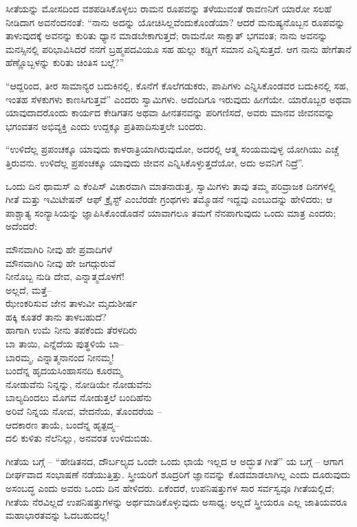 ಸೀತೆಯನ್ನು ಮೋಸದಿಂದ ವಶಪಡಿಸಿಕೊಳ್ಳಲು ರಾಮನ ರೂಪವನ್ನು ತಳೆಯುವಂತೆ ರಾವಣನಿಗೆ ಯಾರೋ ಸಲಹೆ ನೀಡಿದಾಗ ಅವನೆಂದನಂತೆ: “ನಾನು ಅದನ್ನು ಯೋಚಿಸಿಲ್ಲವೆಂದುಕೊಂಡೆಯಾ? ಆದರೆ ಮನುಷ್ಯನೊಬ್ಬನ ರೂಪವನ್ನು ತಾಳುವುದಕ್ಕೆ ಅವನನ್ನು ಕುರಿತು ಧ್ಯಾನ ಮಾಡಬೇಕಾಗುತ್ತದೆ; ರಾಮನೋ ಸಾಕ್ಷಾತ್ ಭಗವಂತ; ನಾನು ಅವನನ್ನು ಮನಸ್ಸಿನಲ್ಲಿ ಪರಿಭಾವಿಸಿದರೆ ನನಗೆ ಬ್ರಹ್ಮಪದವಿಯೂ ಸಹ ಹುಲ್ಲು ಕಡ್ಡಿಗೆ ಸಮಾನ ಎನ್ನಿಸುತ್ತದೆ. ಆಗ ನಾನು ಹೇಗೆತಾನೆ ಹೆಣ್ಣೊಬ್ಬಳನ್ನು ಕುರಿತು ಚಿಂತಿಸ ಬಲ್ಲೆ?”

“ಆದ್ದರಿಂದ, ತೀರ ಸಾಮಾನ್ಯರ ಬದುಕಿನಲ್ಲಿ, ಕೊನೆಗೆ ಕೊಲೆಗಡುಕರು, ಪಾಪಿಗಳು ಎನ್ನಿಸಿಕೊಂಡವರ ಬದುಕಿನಲ್ಲಿ ಸಹ, ಇಂತಹ ಸೆಳಕುಗಳು ಕಾಣಸಿಗುತ್ತವೆ” ಎಂದರು ಸ್ವಾಮಿಗಳು. ಅದೆಂದಿಗೂ ಇರುವುದು ಹೀಗೆಯೇ. ಯಾರೊಬ್ಬರ ಅಥವಾ ಯಾವುದಾದರೊಂದು ಕಾರ್ಯದ ಕೇಡಿಗತನ ಅಥವಾ ಹೀನತನವನ್ನು ಪರಿಗಣಿಸದೆ, ಅವರು ಮಾನವ ಜೀವನವನ್ನು ಭಗಂವತನ ಅಭಿವ್ಯಕ್ತಿ ಎಂದು ಉದ್ದಕ್ಕೂ ಪ್ರತಿಪಾದಿಸುತ್ತಲೇ ಬಂದರು.

“ಉಳಿದೆಲ್ಲ ಪ್ರಪಂಚಕ್ಕೂ ಯಾವುದು ಕಾಳರಾತ್ರಿಯಾಗಿರುವುದೋ, ಅದರಲ್ಲಿ ಆತ್ಮ ಸಂಯಮವುಳ್ಳ ಯೋಗಿಯು ಎಚ್ಚೆ ತ್ತಿರುವನು. ಉಳಿದೆಲ್ಲ ಪ್ರಪಂಚಕ್ಕೂ ಯಾವುದು ಜೀವನ ಎನ್ನಿಸಿಕೊಳ್ಳುತ್ತದೆಯೋ, ಅದು ಅವನಿಗೆ ನಿದ್ರೆ”.

ಒಂದು ದಿನ ಥಾಮಸ್ ಎ ಕೆಂಪಿಸ್ ವಿಚಾರವಾಗಿ ಮಾತನಾಡುತ್ತ, ಸ್ವಾಮಿಗಳು ತಾವು ತಮ್ಮ ಪರಿವ್ರಾಜಕ ದಿನಗಳಲ್ಲಿ ಗೀತೆ ಮತ್ತು ಇಮಿಟೇಷನ್ ಆಫ್ ಕ್ರೈಸ್ಟ್ ಎಂಬೆರಡೇ ಗ್ರಂಥಗಳು ತಮ್ಮೊಡನೆ ಇದ್ದವು ಎಂಬುದನ್ನು ಹೇಳಿದರು; ಆ ಪಾಶ್ಚಾತ್ಯ ಸಂನ್ಯಾಸಿಯನ್ನು ಜ್ಞಾಪಿಸಿಕೊಂಡೊಡನೆ ಯಾವಾಗಲೂ ತಮಗೆ ನೆನಪಾಗುವುದು ಒಂದು ಮಾತ್ರ ಎಂದರು; ಅದೆಂದರೆ:

\begin{myquote}
ಮೌನವಾಗಿರಿ ನೀವು ಹೇ ಪ್ರವಾದಿಗಳೆ\\ಮೌನವಾಗಿರಿ ನೀವು ಹೇ ಜಗದ್ಗುರುವೆ\\ನೀನೊಬ್ಬ ನುಡಿ ದೇವ, ಎನ್ನಾತ್ಮದೊಳಗೆ!\\ಅಲ್ಲದೆ, ಮತ್ತೆ–\\ಝೇಂಕರಿಸುವ ಜೇನ ತಾಳುವೀ ಮೃದುಶೀರ್ಷ\\ಹಕ್ಕಿ ಕೂತರೆ ತಾನು ತಾಳಬಹುದೆ?\\ಹಾಗಾಗಿ ಉಮೆ ನೀನು ತಪಕೆಂದು ತೆರಳದಿರು\\ಬಾ ತಾಯಿ, ಎನ್ನೆದೆಯ ಪುತ್ಥಳಿಯೆ ಬಾ–\\ಬಾರಮ್ಮ, ಎನ್ನಾತ್ಮನಾನಂದ ನೀನಮ್ಮ!\\ಬಂದೆನ್ನ ಹೃದಯಸಿಂಹಾಸನದಿ ಕೂರಮ್ಮ\\ನೋಡುವೆನು ನಿನ್ನನ್ನು, ನೋಡಿಯೇ ನೋಡುವೆನು\\ಬಾಲ್ಯದಿಂದಲು ಮೊಗವ ನೋಡುತ್ತಲೆ ಬಂದಿಹೆನು\\ಅರಿವೆ ನಿನ್ನಯ ನೋವ, ವೇದನೆಯ, ತೊಂದರೆಯ –\\ಆದಕಾರಣ ತಾಯೆ, ಬಂದೆನ್ನ ಹೃತ್ಪದ್ಮ–\\ದಲಿ ಕುಳಿತು ನೆಲೆನಿಲ್ಲು, ಅನವರತ ಉಳಿದುಬಿಡು.
\end{myquote}

ಗೀತೆಯ ಬಗ್ಗೆ – “ಹೇಡಿತನದ, ದೌರ್ಬಲ್ಯದ ಒಂದೇ ಒಂದು ಛಾಯೆ ಇಲ್ಲದ ಆ ಅದ್ಭುತ ಗೀತೆ” ಯ ಬಗ್ಗೆ – ಆಗಾಗ ದೀರ್ಘವಾದ ಸಂಭಾಷಣೆ ನಡೆಯುತ್ತಿತ್ತು. ಸ್ತ್ರೀಯರಿಗೆ ಶೂದ್ರರಿಗೆ ಜ್ಞಾನವನ್ನು ಕೊಡಮಾಡಲಾಗಿಲ್ಲ ಎಂದು ದೂರುವುದು ಅಸಂಬದ್ಧ ಎಂದು ಅವರು ಒಂದು ದಿನ ಹೇಳಿದರು. ಏಕೆಂದರೆ, ಉಪನಿಷತ್ತುಗಳ ಸಾರ ಸರ್ವಸ್ವವೂ ಗೀತೆಯಲ್ಲಿದೆ; ಗೀತೆಯ ನೆರವಿಲ್ಲದೆ ಉಪನಿಷತ್ತುಗಳನ್ನು ಅರ್ಥಮಾಡಿಕೊಳ್ಳುವುದು ಅಸಾಧ್ಯ; ಅಲ್ಲದೆ ಸ್ತ್ರೀಯರೂ ಎಲ್ಲ ಜಾತಿಯವರೂ ಮಹಾಭಾರತವನ್ನು ಓದಬಹುದಲ್ಲ!

